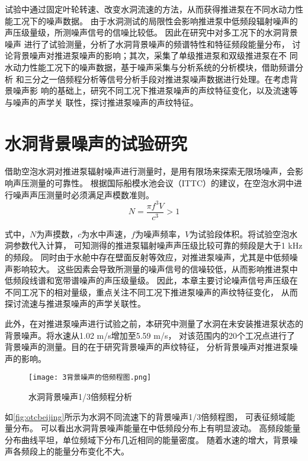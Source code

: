 试验中通过固定叶轮转速、改变水洞流速的方法，从而获得推进泵在不同水动力性能工况下的噪声数据。
由于水洞测试的局限性会影响推进泵中低频段辐射噪声的声压级量级，所测噪声信号的信噪比较低。
因此在研究中对多工况下的水洞背景噪声
进行了试验测量，分析了水洞背景噪声的频谱特性和特征频段能量分布，
讨论背景噪声对推进泵噪声的影响；其次，采集了单级推进泵和双级推进泵在不
同水动力性能工况下的噪声数据，基于噪声采集与分析系统的分析模块，借助频谱分析
和三分之一倍频程分析等信号分析手段对推进泵噪声数据进行处理。在考虑背景噪声影
响的基础上，研究不同工况下推进泵噪声的声纹特征变化，以及流速等与噪声的声学关
联性，探讨推进泵噪声的声纹特征。
\section{水洞背景噪声的试验研究}
借助空泡水洞对推进泵辐射噪声进行测量时，是用有限场来探索无限场噪声，会影响声压测量的可靠性。
根据国际船模水池会议（ITTC）的建议，在空泡水洞中进行噪声声压测量时必须满足声模数准则\cite{曾赛2018试验研究}。
\begin{equation}
    \label{equ:fm}
    N=\frac{\pi f^3V}{c^3} > 1
\end{equation}

式中，$N$为声摸数，$c$为水中声速，$f$为噪声频率，$V$为试验段体积。将试验空泡水洞参数代入计算，
可知测得的推进泵辐射噪声声压级比较可靠的频段是大于1 kHz的频段。
同时由于水舱中存在壁面反射等效应，对推进泵噪声，尤其是中低频噪声影响较大。
这些因素会导致所测量的噪声信号的信噪较低，从而影响推进泵中低频段线谱和宽带谱噪声的声压级量级。
因此，本章主要讨论噪声信号声压级在不同工况下的相对量级，重点关注不同工况下推进泵噪声的声纹特征变化，
从而探讨流速与推进泵噪声的声学关联性。

此外，在对推进泵噪声进行试验之前，本研究中测量了水洞在未安装推进泵状态的背景噪声。将水速从1.02 m/s增加至5.59 m/s，
对该范围内的20个工况点进行了背景噪声的测量。目的在于研究背景噪声的声纹特征，
分析背景噪声对推进泵噪声的影响。
\begin{figure}[htbp]
    \centering
    \texttt{[image: 3背景噪声的倍频程图.png]}
    \caption{\label{fig:otcbeijing}水洞背景噪声1/3倍频程分析}
\end{figure}

如\autoref{fig:otcbeijing}所示为水洞不同流速下的背景噪声1/3倍频程图，
可表征频域能量分布。
可以看出水洞背景噪声能量在中低频段分布上有明显波动。
高频段能量分布曲线平坦，单位频域下分布几近相同的能量密度。
随着水速的增大，背景噪声各频段上的能量分布变化不大。

